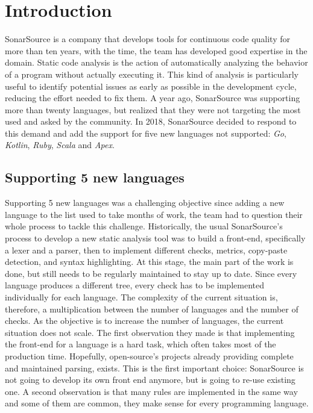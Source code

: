 \section{Introduction}
\label{sec:introduction}
SonarSource is a company that develops tools for continuous code quality for more than ten years, with the time, the team has developed good expertise in the domain.
Static code analysis is the action of automatically analyzing the behavior of a program without actually executing it.
This kind of analysis is particularly useful to identify potential issues as early as possible in the development cycle, reducing the effort needed to fix them.
A year ago, SonarSource was supporting more than twenty languages, but realized that they were not targeting the most used and asked by the community.
In 2018, SonarSource decided to respond to this demand and add the support for five new languages not supported: \emph{Go}, \emph{Kotlin}, \emph{Ruby}, \emph{Scala} and \emph{Apex}.

\subsection{Supporting 5 new languages}
\label{subsec:5_new_languages}
Supporting 5 new languages was a challenging objective since adding a new language to the list used to take months of work, the team had to question their whole process to tackle this challenge.
Historically, the usual SonarSource's process to develop a new static analysis tool was to build a front-end, specifically a lexer and a parser, then to implement different checks, metrics, copy-paste detection, and syntax highlighting. 
At this stage, the main part of the work is done, but still needs to be regularly maintained to stay up to date.
Since every language produces a different tree, every check has to be implemented individually for each language.
The complexity of the current situation is, therefore, a multiplication between the number of languages and the number of checks.
As the objective is to increase the number of languages, the current situation does not scale.
The first observation they made is that implementing the front-end for a language is a hard task, which often takes most of the production time. 
Hopefully, open-source's projects already providing complete and maintained parsing, exists. 
This is the first important choice: SonarSource is not going to develop its own front end anymore, but is going to re-use existing one.
A second observation is that many rules are implemented in the same way and some of them are common, they make sense for every programming language.



